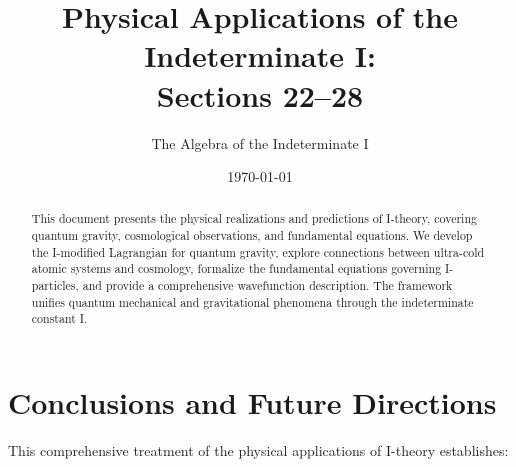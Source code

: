 \documentclass[12pt,a4paper]{article}
\title{Physical Applications of the Indeterminate I:\\
Sections 22--28}
\author{The Algebra of the Indeterminate I}
\date{\today}
\theoremstyle{definition}
\theoremstyle{remark}
\begin{document}
\maketitle

\begin{abstract}
This document presents the physical realizations and predictions of I-theory, covering quantum gravity, cosmological observations, and fundamental equations. We develop the I-modified Lagrangian for quantum gravity, explore connections between ultra-cold atomic systems and cosmology, formalize the fundamental equations governing I-particles, and provide a comprehensive wavefunction description. The framework unifies quantum mechanical and gravitational phenomena through the indeterminate constant I.
\end{abstract}

\tableofcontents
\newpage


\newpage


\newpage


\newpage


\newpage


\newpage


\newpage



\newpage
\section{Conclusions and Future Directions}

This comprehensive treatment of the physical applications of I-theory establishes:
\end{document}
